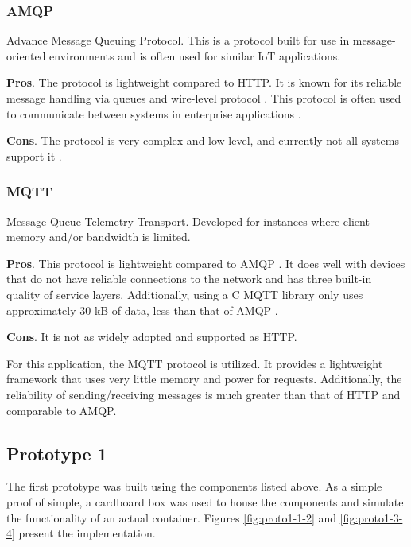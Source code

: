 \subsubsection{AMQP}

Advance Message Queuing Protocol. This is a protocol built for use in message-oriented environments and is often used for similar IoT applications.

\noindent\textbf{Pros}. The protocol is lightweight compared to HTTP. It is known for its reliable message handling via queues and wire-level protocol \cite{iot-survey}. This protocol is often used to communicate between systems in enterprise applications \cite{amqp-org}.

\noindent\textbf{Cons}. The protocol is very complex and low-level, and currently not all systems support it \cite{ironio-iot}.

\subsubsection{MQTT}

Message Queue Telemetry Transport. Developed for instances where client memory and/or bandwidth is limited.

\noindent\textbf{Pros}. This protocol is lightweight compared to AMQP \cite{vmware-iot}. It does well with devices that do not have reliable connections to the network and has three built-in quality of service layers. Additionally, using a C MQTT library only uses approximately 30 kB of data, less than that of AMQP \cite{redbooks-mqtt}.

\noindent\textbf{Cons}. It is not as widely adopted and supported as HTTP. 

For this application, the MQTT protocol is utilized. It provides a lightweight framework that uses very little memory and power for requests. Additionally, the reliability of sending/receiving messages is much greater than that of HTTP and comparable to AMQP.

\subsection{Prototype 1}

The first prototype was built using the components listed above. As a simple proof of simple, a cardboard box was used to house the components and simulate the functionality of an actual container. Figures \ref{fig:proto1-1-2} and \ref{fig:proto1-3-4} present the implementation.

